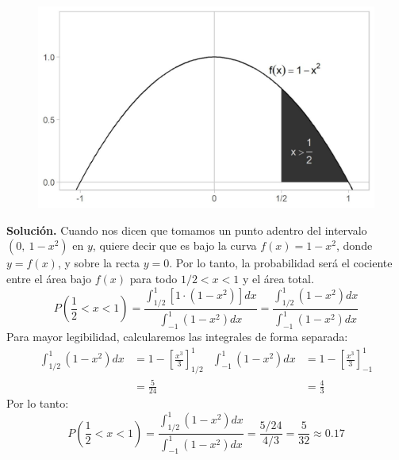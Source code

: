 \documentclass[12pt]{article}
\begin{document}
\begin{figure}[hbt!]
\centering
\includegraphics[scale=0.55]{img/prob-example.jpg}
\end{figure}

\textbf{Solución.} Cuando nos dicen que tomamos un punto adentro del intervalo $(0, \ 1-x^{2})$ en $y$, quiere decir que es bajo la curva $f(x) = 1 - x^{2}$, donde $y = f(x)$, y sobre la recta $y = 0$. Por lo tanto, la probabilidad será el cociente entre el área bajo $f(x)$ para todo $1/2 < x < 1$ y el área total.
\[
  P\left(\frac{1}{2} < x < 1\right) = \frac{\int_{1/2}^{1} [1 \cdot (1 - x^{2})]dx}{\int_{-1}^{1} (1 - x^{2})dx}
                                    = \frac{\int_{1/2}^{1} (1 - x^{2})dx}{\int_{-1}^{1} (1 - x^{2})dx}
\]
Para mayor legibilidad, calcularemos las integrales de forma separada:
\begin{align*}
\int_{1/2}^{1} (1 - x^{2})dx &= 1 - \left[\frac{x^{3}}{3}\right]_{1/2}^{1} &
\int_{-1}^{1} (1 - x^{2})dx &= 1 - \left[\frac{x^{3}}{3}\right]_{-1}^{1} \\
&= \frac{5}{24} &
&= \frac{4}{3}
\end{align*}
Por lo tanto:
\[
  P\left(\frac{1}{2} < x < 1\right) = \frac{\int_{1/2}^{1} (1 - x^{2})dx}{\int_{-1}^{1} (1 - x^{2})dx}
                                    = \frac{5/24}{4/3}
                                    = \frac{5}{32}
                                \approx 0.17
\]
\end{document}
